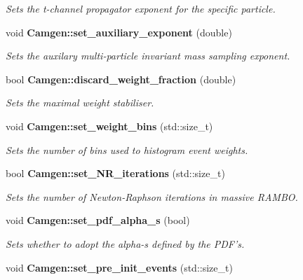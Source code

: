 \begin{DoxyCompactItemize}
\begin{DoxyCompactList}\small\item\em Sets the t-\/channel propagator exponent for the specific particle. \end{DoxyCompactList}\item 
\hypertarget{a00849_a219249a7b2b4cf736431df5ffb416d3a}{void {\bfseries Camgen\-::set\-\_\-auxiliary\-\_\-exponent} (double)}\label{a00849_a219249a7b2b4cf736431df5ffb416d3a}

\begin{DoxyCompactList}\small\item\em Sets the auxilary multi-\/particle invariant mass sampling exponent. \end{DoxyCompactList}\item 
bool {\bfseries Camgen\-::discard\-\_\-weight\-\_\-fraction} (double)
\begin{DoxyCompactList}\small\item\em Sets the maximal weight stabiliser. \end{DoxyCompactList}\item 
\hypertarget{a00849_aa89925c5963205476e5eab0603de642a}{void {\bfseries Camgen\-::set\-\_\-weight\-\_\-bins} (std\-::size\-\_\-t)}\label{a00849_aa89925c5963205476e5eab0603de642a}

\begin{DoxyCompactList}\small\item\em Sets the number of bins used to histogram event weights. \end{DoxyCompactList}\item 
bool {\bfseries Camgen\-::set\-\_\-\-N\-R\-\_\-iterations} (std\-::size\-\_\-t)
\begin{DoxyCompactList}\small\item\em Sets the number of Newton-\/\-Raphson iterations in massive R\-A\-M\-B\-O. \end{DoxyCompactList}\item 
\hypertarget{a00849_aefa2cea0a25ca101c7302b4483fb9b24}{void {\bfseries Camgen\-::set\-\_\-pdf\-\_\-alpha\-\_\-s} (bool)}\label{a00849_aefa2cea0a25ca101c7302b4483fb9b24}

\begin{DoxyCompactList}\small\item\em Sets whether to adopt the alpha-\/s defined by the P\-D\-F's. \end{DoxyCompactList}\item 
\hypertarget{a00849_a858c6ffafa0806fb33c28a0d40708866}{void {\bfseries Camgen\-::set\-\_\-pre\-\_\-init\-\_\-events} (std\-::size\-\_\-t)}\label{a00849_a858c6ffafa0806fb33c28a0d40708866}


\end{DoxyCompactItemize}
